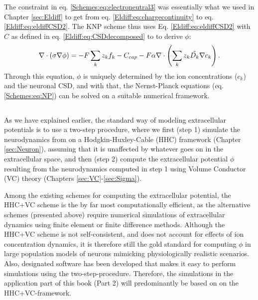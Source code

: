 The constraint in eq. \ref{Schemes:eq:electroneutral3} was essentially what we used in Chapter \ref{sec:Eldiff} to get from eq. \ref{Eldiff:eq:chargecontinuity} to eq. \ref{Eldiff:eq:eldiffCSD2}. The KNP scheme thus uses Eq. \ref{Eldiff:eq:eldiffCSD2} with $C$ as defined in eq.  \ref{Eldiff:eq:CSDdecomposed} to to derive $\phi$:
\begin{equation}
\nabla \cdot (\sigma\nabla\phi) = - F \sum_k z_k f_k -  C_{cap} - F\alpha \nabla \cdot \left (\sum_k{z_k \tilde{D_k}{\bf \nabla} c_{k}} \right).
\label{Schemes:eq:KNPfinal}
\end{equation}
Through this equation, $\phi$ is uniquely determined by the ion concentrations ($c_k$) and the neuronal CSD, and with that, the Nernst-Planck equations (eq. \ref{Schemes:eq:NP}) can be solved on a suitable numerical framework.


\subsection{}
\label{sec:Schemes:VC}

As we have explained earlier, the standard way of modeling extracellular potentials is to use a two-step procedure, where we first (step 1) simulate the neurodynamics from on a Hodgkin-Huxley-Cable (HHC) framework (Chapter \ref{sec:Neuron}), assuming that it is unaffected by whatever goes on in the extracellular space, and then (step 2) compute the extracellular potential $\phi$ resulting from the neurodynamics computed in step 1 using Volume Conductor (VC) theory (Chapters \ref{sec:VC}-\ref{sec:Sigma}). 

Among the existing schemes for computing the extracellular potential, the HHC+VC scheme is the by far most computationally efficient, as the alternative schemes (presented above) require numerical simulations of extracellular dynamics using finite element or finite difference methods. Although the HHC+VC scheme is not self-consistent, and does not account for effects of ion concentration dynamics, it is therefore still the gold standard for computing $\phi$ in large population models of neurons mimicking physiologically realistic scenarios. Also, designated software has been developed that makes it easy to perform simulations using the two-step-procedure. Therefore, the simulations in the application part of this book (Part 2) will predominantly be based on on the HHC+VC-framework.

